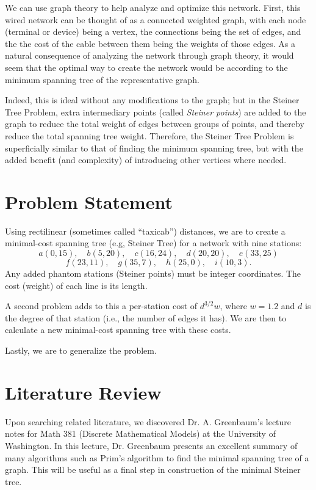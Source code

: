 \documentclass[12pt,letterpaper]{article}
\theoremstyle{definition}\newtheorem{defn}[defncounter]{Definition}
\theoremstyle{remark}\newtheorem*{remark}{Remark}
\begin{document}
We can use graph theory to help analyze and optimize this network. First, this wired network can be thought of as a connected 
weighted graph, with each node (terminal or device) being a vertex, the connections being the set of edges, and the the cost of 
the cable between them being the weights of those edges. As a natural consequence of analyzing the network through graph theory, 
it would seem that the optimal way to create the network would be according to the minimum spanning tree of the representative 
graph.

Indeed, this is ideal without any modifications to the graph; but in the Steiner Tree Problem, extra intermediary points (called 
\emph{Steiner points}) are added to the graph to reduce the total weight of edges between groups of points, and thereby reduce the 
total spanning tree weight. Therefore, the Steiner Tree Problem is superficially similar to that of finding the minimum spanning 
tree, but with the added benefit (and complexity) of introducing other vertices where needed.

\section{Problem Statement}

Using rectilinear (sometimes called ``taxicab'') distances, we are to create a minimal-cost spanning tree (e.g, Steiner Tree) for a 
network with nine stations: \[a(0, 15), \quad b(5, 20), \quad c(16, 24), \quad d(20, 20), \quad e(33, 25) \] \[ f(23, 11), \quad 
g(35, 7), \quad h(25, 0), \quad i(10, 3) \text{.}\] Any added phantom stations (Steiner points) must be integer coordinates. The cost 
(weight) of each line is its length.

A second problem adds to this a per-station cost of \(d^{3/2}w\), where \(w = 1.2\) and \(d\) is the degree of that station (i.e., 
the number of edges it has). We are then to calculate a new minimal-cost spanning tree with these costs.

Lastly, we are to generalize the problem.


\section{Literature Review}

Upon searching related literature, we discovered Dr. A. Greenbaum's lecture notes for Math 381 (Discrete 
Mathematical Models) at the University of Washington. In this lecture, Dr. Greenbaum presents an excellent summary of many 
algorithms such as Prim's algorithm to find the minimal spanning tree of a graph. This will be useful as a final step in 
construction of the minimal Steiner tree. 
\end{document}
